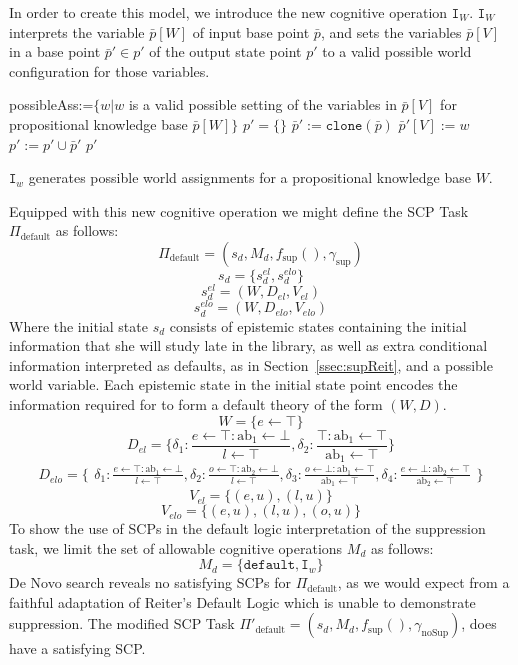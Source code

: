 In order to create this model, we introduce the new cognitive operation $\texttt{I}_W$. $\texttt{I}_W$ interprets the variable $\bar{p}[W]$ of input base point $\bar{p}$, and sets the variables  $\bar{p}[V]$ in a base point $\bar{p}'\in p'$ of the output state point $p'$ to a valid possible world configuration for those variables.


\begin{algorithm}[H] \label{alg:I}
\SetAlgoLined
{}
{
possibleAss:=$\{w|w$ is a valid possible setting of the variables in $ \bar{p}[V] $ for propositional knowledge base $\bar{p}[W]\}$\;
$p'=\{\}$\;
{
$\bar{p}':=\texttt{clone}(\bar{p})$\;
$\bar{p}'[V]:=w$\;
$p':=p' \cup \bar{p}'$\;
} 
\Return $p'$
}
\caption{$\texttt{I}_w$ generates possible world assignments for a propositional knowledge base $W$.}
\end{algorithm}

Equipped with this new cognitive operation we might define the SCP Task $\Pi_\text{default}$ as follows:
\[\Pi_\text{default}=(s_d,M_d,f_\text{sup}(),\gamma_\text{sup})\]
\[s_d=\{s_d^{el}, s_d^{elo}\}\]
\[s_d^{el}=(W,D_{el},V_{el})\]
\[s_d^{elo}=(W,D_{elo},V_{elo})\]
Where the initial state $s_d$ consists of epistemic states containing the initial information that she will study late in the library, as well as extra conditional information interpreted as defaults, as in Section~\ref{ssec:supReit}, and a possible world variable. Each epistemic state in the initial state point encodes the information required for to form a default theory of the form $(W,D)$.
\[W=\{e\leftarrow \top\}\]
\[
D_{el}=\{\delta_1:\frac{e\leftarrow \top:\text{ab}_1 \leftarrow \bot}{l\leftarrow\top} ,
\delta_2:\frac{\top:\text{ab}_1 \leftarrow \top}{\text{ab}_1\leftarrow\top}
\}
\]
\[
D_{elo}=\{\begin{matrix}\delta_1:\frac{e\leftarrow \top:\text{ab}_1 \leftarrow \bot}{l\leftarrow\top} ,
\delta_2:\frac{o\leftarrow \top:\text{ab}_2 \leftarrow \bot}{l\leftarrow\top},
\delta_3:\frac{o\leftarrow \bot:\text{ab}_1 \leftarrow \top}{\text{ab}_1\leftarrow\top},
\delta_4:\frac{e\leftarrow \bot:\text{ab}_2 \leftarrow \top}{\text{ab}_2\leftarrow\top}
\end{matrix}\}
\]
\[V_{el}=\{(e,u),(l,u)\}\]
\[V_{elo}=\{(e,u),(l,u), (o,u)\}\]
To show the use of SCPs in the default logic interpretation of the suppression task, we limit the set of allowable cognitive operations $M_d$ as follows:
\[M_d=\{\texttt{default},\texttt{I}_w\}\]
De Novo search reveals no satisfying SCPs for $\Pi_\text{default}$, as we would expect from a faithful adaptation of Reiter's Default Logic which is unable to demonstrate suppression. The modified SCP Task $\Pi'_\text{default}=(s_d,M_d,f_\text{sup}(),\gamma_\text{noSup})$, does have a satisfying SCP.

